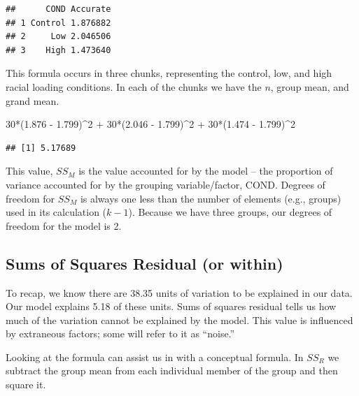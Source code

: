 \documentclass[
  english,
]{book}
\newenvironment{Shaded}{\begin{snugshade}}{\end{snugshade}}
\newcommand{\DecValTok}[1]{\textcolor[rgb]{0.00,0.00,0.81}{#1}}
\newcommand{\FloatTok}[1]{\textcolor[rgb]{0.00,0.00,0.81}{#1}}
\newcommand{\NormalTok}[1]{#1}
\newcommand{\SpecialCharTok}[1]{\textcolor[rgb]{0.00,0.00,0.00}{#1}}
\begin{document}
\begin{verbatim}
##      COND Accurate
## 1 Control 1.876882
## 2     Low 2.046506
## 3    High 1.473640
\end{verbatim}

This formula occurs in three chunks, representing the control, low, and high racial loading conditions. In each of the chunks we have the \(n\), group mean, and grand mean.

\begin{Shaded}
\begin{Highlighting}[]
\DecValTok{30}\SpecialCharTok{*}\NormalTok{(}\FloatTok{1.876} \SpecialCharTok{{-}} \FloatTok{1.799}\NormalTok{)}\SpecialCharTok{\^{}}\DecValTok{2} \SpecialCharTok{+} \DecValTok{30}\SpecialCharTok{*}\NormalTok{(}\FloatTok{2.046} \SpecialCharTok{{-}} \FloatTok{1.799}\NormalTok{)}\SpecialCharTok{\^{}}\DecValTok{2} \SpecialCharTok{+} \DecValTok{30}\SpecialCharTok{*}\NormalTok{(}\FloatTok{1.474} \SpecialCharTok{{-}} \FloatTok{1.799}\NormalTok{)}\SpecialCharTok{\^{}}\DecValTok{2}
\end{Highlighting}
\end{Shaded}

\begin{verbatim}
## [1] 5.17689
\end{verbatim}

This value, \(SS_M\) is the value accounted for by the model -- the proportion of variance accounted for by the grouping variable/factor, COND. Degrees of freedom for \(SS_M\) is always one less than the number of elements (e.g., groups) used in its calculation (\(k-1\)). Because we have three groups, our degrees of freedom for the model is 2.

\hypertarget{sums-of-squares-residual-or-within}{%
\subsection{Sums of Squares Residual (or within)}\label{sums-of-squares-residual-or-within}}

To recap, we know there are 38.35 units of variation to be explained in our data. Our model explains 5.18 of these units. Sums of squares residual tells us how much of the variation cannot be explained by the model. This value is influenced by extraneous factors; some will refer to it as ``noise.''

Looking at the formula can assist us in with a conceptual formula. In \(SS_R\) we subtract the group mean from each individual member of the group and then square it.
\end{document}
